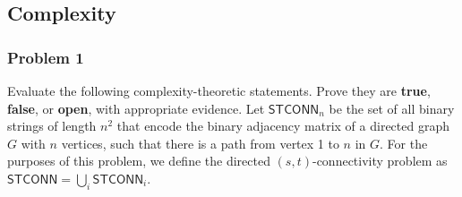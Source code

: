 \documentclass{article}
\newcommand{\STCONN}{\mathsf{STCONN}}
\begin{document}
\subsection{Complexity}

\subsubsection{Problem 1}
Evaluate the following complexity-theoretic statements. Prove they are \textbf{true}, \textbf{false}, or \textbf{open}, with appropriate evidence. Let \(\STCONN_n\) be the set of all binary strings of length \(n^2\) that encode the binary adjacency matrix of a directed graph \(G\) with \(n\) vertices, such that there is a path from vertex 1 to \(n\) in \(G\). For the purposes of this problem, we define the directed \((s,t)\)-connectivity problem as \(\STCONN = \bigcup_i \STCONN_i\).
\end{document}
